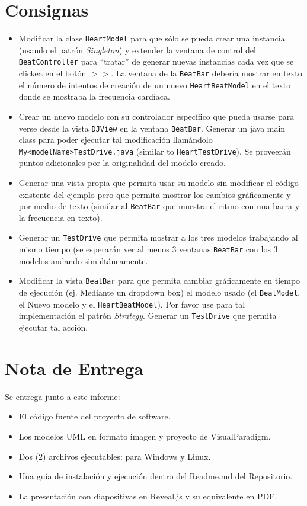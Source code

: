 \documentclass[10pt]{article} %
\newcommand{\comillas}[1]{``#1''}
\begin{document}
\section{Consignas}
\begin{itemize}
\item Modificar la clase \verb+HeartModel+ para que sólo se pueda crear una instancia (usando el patrón
\textit{Singleton}) y extender la ventana de control del \verb+BeatController+ para \comillas{tratar} de generar nuevas
instancias cada vez que se clickea en el  botón $>>$. La ventana de  la \verb+BeatBar+ debería mostrar
en texto el número de intentos de creación de un nuevo \verb+HeartBeatModel+ en el texto donde se
mostraba la frecuencia cardíaca.

\item Crear un nuevo modelo con su controlador específico que pueda usarse para verse desde la
vista \verb+DJView+ en la ventana \verb+BeatBar+. Generar un java main class para poder ejecutar tal
modificación llamándolo \verb+My<modelName>TestDrive.java+ (similar to \verb+HeartTestDrive+). Se
proveerán puntos adicionales por la originalidad del modelo creado.

\item Generar una vista propia que permita usar su modelo sin modificar el código existente del
ejemplo pero que permita mostrar los cambios gráficamente y por medio de texto (similar al
\verb+BeatBar+ que muestra el ritmo con una barra y la frecuencia en texto).

\item Generar un \verb+TestDrive+ que permita mostrar a los tres modelos trabajando al mismo tiempo (se
esperarán ver al menos 3 ventanas \verb+BeatBar+ con los 3 modelos andando simultáneamente.

\item Modificar la vista \verb+BeatBar+ para que permita cambiar gráficamente en tiempo de ejecución (ej.
Mediante un dropdown box) el modelo usado (el \verb+BeatModel+, el Nuevo modelo y el \verb+HeartBeatModel+). Por favor use para tal implementación el patrón \textit{Strategy}. Generar un \verb+TestDrive+ que permita ejecutar tal acción.

\end{itemize}


\section{Nota de Entrega}
Se entrega junto a este informe:
\begin{itemize}
\item El código fuente del proyecto de software.
\item Los modelos UML en formato imagen y proyecto de VisualParadigm\circledR.
\item Dos (2) archivos ejecutables: para Windows y Linux.
\item Una guía de instalación y ejecución dentro del Readme.md del Repositorio.
\item La presentación con diapositivas en Reveal.js y su equivalente en PDF.
\end{itemize}
\end{document}
